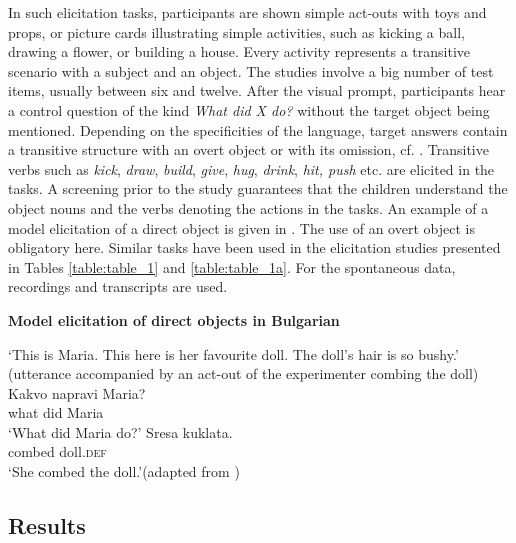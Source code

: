 \documentclass[output=paper,
modfonts,
newtxmath,
hidelinks,
]{langscibook}
\begin{document}
\noindent In such elicitation tasks, participants are shown simple act-outs with toys and props, or picture cards illustrating simple activities, such as kicking a ball, drawing a flower, or building a house. Every activity represents a transitive scenario with a subject and an object. The studies involve a big number of test items, usually between six and twelve. After the visual prompt, participants hear a control question of the kind \textit{What did X do?} without the target object being mentioned. Depending on the specificities of the language, target answers contain a transitive structure with an overt object or with its omission, cf. . Transitive verbs such as \textit{kick}, \textit{draw}, \textit{build}, \textit{give}, \textit{hug}, \textit{drink}, \textit{hit, push} etc. are elicited in the tasks. A screening prior to the study guarantees that the children understand the object nouns and the verbs denoting the actions in the tasks. An example of a model elicitation of a direct object is given in . The use of an overt object is obligatory here. Similar tasks have been used in the elicitation studies presented in Tables \ref{table:table_1} and \ref{table:table_1a}. For the spontaneous data, recordings and transcripts are used.\largerpage[-2]

\ea \textbf{Model elicitation of direct objects in Bulgarian}\label{ex5}
\begin{exe}
\exi{}   `This is Maria. This here is her favourite doll. The doll’s hair is so bushy.' (utterance accompanied by an act-out of the experimenter combing the doll)
\exi{}	\gll Kakvo napravi Maria?\\
     	what did Maria\\
		\glt ‘What did Maria do?’
\exi{}	\gll Sresa kuklata.\\
        combed doll.\textsc{def}\\
		\glt ‘She combed the doll.’\hfill (adapted from \citealt[79]{Radeva-Bork2012})
\end{exe}        
\z

\subsection{Results}\label{sec:key:3.2}
\end{document}
